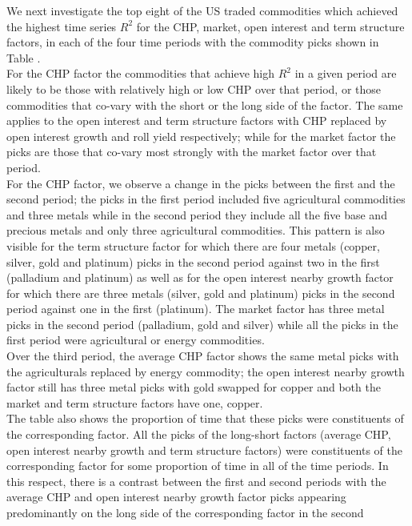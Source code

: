\documentclass[
  authoryear,
  preprint,
  3p]{elsarticle}
\begin{document}
\medskip

We next investigate the top eight of the US traded commodities which
achieved the highest time series \(R^{2}\) for the CHP, market, open
interest and term structure factors, in each of the four time periods
with the commodity picks shown in Table .\\
For the CHP factor the commodities that achieve high \(R^{2}\) in a
given period are likely to be those with relatively high or low CHP over
that period, or those commodities that co-vary with the short or the
long side of the factor. The same applies to the open interest and term
structure factors with CHP replaced by open interest growth and roll
yield respectively; while for the market factor the picks are those that
co-vary most strongly with the market factor over that period.\\
For the CHP factor, we observe a change in the picks between the first
and the second period; the picks in the first period included five
agricultural commodities and three metals while in the second period
they include all the five base and precious metals and only three
agricultural commodities. This pattern is also visible for the term
structure factor for which there are four metals (copper, silver, gold
and platinum) picks in the second period against two in the first
(palladium and platinum) as well as for the open interest nearby growth
factor for which there are three metals (silver, gold and platinum)
picks in the second period against one in the first (platinum). The
market factor has three metal picks in the second period (palladium,
gold and silver) while all the picks in the first period were
agricultural or energy commodities.\\
Over the third period, the average CHP factor shows the same metal picks
with the agriculturals replaced by energy commodity; the open interest
nearby growth factor still has three metal picks with gold swapped for
copper and both the market and term structure factors have one,
copper.\\
The table also shows the proportion of time that these picks were
constituents of the corresponding factor. All the picks of the
long-short factors (average CHP, open interest nearby growth and term
structure factors) were constituents of the corresponding factor for
some proportion of time in all of the time periods. In this respect,
there is a contrast between the first and second periods with the
average CHP and open interest nearby growth factor picks appearing
predominantly on the long side of the corresponding factor in the second
\end{document}
